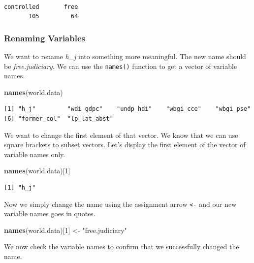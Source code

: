 \documentclass[]{article}
\newenvironment{Shaded}{\begin{snugshade}}{\end{snugshade}}
\newcommand{\KeywordTok}[1]{\textcolor[rgb]{0.13,0.29,0.53}{\textbf{#1}}}
\newcommand{\DecValTok}[1]{\textcolor[rgb]{0.00,0.00,0.81}{#1}}
\newcommand{\StringTok}[1]{\textcolor[rgb]{0.31,0.60,0.02}{#1}}
\newcommand{\NormalTok}[1]{#1}
\theoremstyle{definition}
\theoremstyle{definition}
\theoremstyle{definition}
\theoremstyle{remark}
\begin{document}
\begin{verbatim}

controlled       free 
       105         64 
\end{verbatim}

\subsubsection{Renaming Variables}\label{renaming-variables}

We want to rename \emph{h\_j} into something more meaningful. The new
name should be \emph{free.judiciary}. We can use the \texttt{names()}
function to get a vector of variable names.

\begin{Shaded}
\begin{Highlighting}[]
\KeywordTok{names}\NormalTok{(world.data)}
\end{Highlighting}
\end{Shaded}

\begin{verbatim}
[1] "h_j"         "wdi_gdpc"    "undp_hdi"    "wbgi_cce"    "wbgi_pse"   
[6] "former_col"  "lp_lat_abst"
\end{verbatim}

We want to change the first element of that vector. We know that we can
use square brackets to subset vectors. Let's display the first element
of the vector of variable names only.

\begin{Shaded}
\begin{Highlighting}[]
\KeywordTok{names}\NormalTok{(world.data)[}\DecValTok{1}\NormalTok{]}
\end{Highlighting}
\end{Shaded}

\begin{verbatim}
[1] "h_j"
\end{verbatim}

Now we simply change the name using the assignment arrow
\texttt{\textless{}-} and our new variable names goes in quotes.

\begin{Shaded}
\begin{Highlighting}[]
\KeywordTok{names}\NormalTok{(world.data)[}\DecValTok{1}\NormalTok{] <-}\StringTok{ "free.judiciary"}
\end{Highlighting}
\end{Shaded}

We now check the variable names to confirm that we successfully changed
the name.
\end{document}
